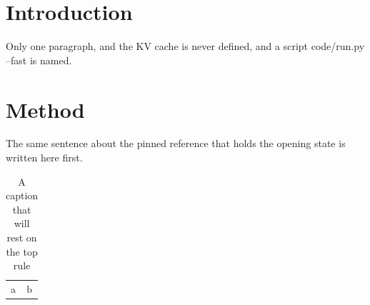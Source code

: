 \documentclass{article}
\begin{document}
\begin{abstract}
Long. Long. Long. Long. Long. Long. Long. Long. Long. Long. Long. Long. Long.
Long. Long. Long. Long. Long. Long. Long. Long. Long. Long. Long. Long. Long.
Long. Long. Long. Long. Long. Long. Long. Long. Long. Long. Long. Long. Long.
Long. Long. Long. Long. Long. Long. Long. Long. Long. Long. Long. Long. Long.
Long. Long. Long. Long. Long. Long. Long. Long. Long. Long. Long. Long. Long.
Long. Long. Long. Long. Long. Long. Long. Long. Long. Long. Long. Long. Long.
Long. Long. Long. Long. Long. Long. Long. Long. Long. Long. Long. Long. Long.
Long. Long. Long. Long. Long. Long. Long. Long. Long. Long. Long. Long. Long.
Long. Long. Long. Long. Long. Long. Long. Long. Long. Long. Long. Long. Long.
Long. Long. Long. Long. Long. Long. Long. Long. Long. Long. Long. Long. Long.
Long. Long. Long. Long. Long. Long. Long. Long. Long. Long. Long. Long. Long.
Long. Long. Long. Long. Long. Long. Long. Long. Long. Long. Long. Long. Long.
Long. Long. Long. Long. Long. Long. Long. Long. Long. Long. Long. Long. Long.
Long. Long. Long. Long. Long. Long. Long. Long. Long. Long. Long. Long. Long.
Long. Long. Long. Long. Long. Long. Long. Long. Long. Long. Long. Long. Long.
Long. Long. Long. Long. Long. Long. Long. Long. Long. Long. Long. Long. Long.
Long. Long. Long. Long. Long. Long. Long. Long. Long. Long. Long. Long. Long.
Long. Long. Long. Long. Long. Long. Long. Long. Long. Long. Long. Long. Long.
Long. Long. Long. Long. Long. Long. Long. Long. Long. Long. Long. Long. Long.
Long. Long. Long. Long. Long. Long. Long. Long. Long. Long. Long. Long. Long.
Long. Long. Long. Long. Long. Long. Long. Long. Long. Long. Long. Long. Long.
Long. Long. Long. Long. Long. Long. Long. Long. Long. Long. Long. Long. Long.
Long. Long. Long. Long. Long. Long. Long. Long. Long. Long. Long. Long. Long.
Long. Long. Long. Long. Long. Long. Long.
\end{abstract}
\section{Introduction}\label{sec:intro}
Only one paragraph, and the KV cache is never defined, and a script code/run.py --fast is named.
\section{Method}\label{sec:method}
The same sentence about the pinned reference that holds the opening state is written here first.
\begin{table}[t]\caption{A caption that will rest on the top rule}\begin{tabular}{ll}a&b\end{tabular}\end{table}
\end{document}

